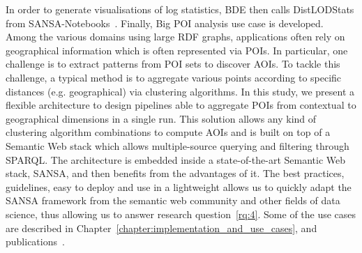 \begin{enumerate}
    In order to generate visualisations of log statistics, BDE then calls DistLODStats from SANSA-Notebooks~\cite{iermilov-2017-sansa-iswc-demo}.
    Finally, Big \gls{POI} analysis use case is developed.
    Among the various domains using large \gls{RDF} graphs, applications often rely on geographical information which is often represented via \gls{POI}s.
    In particular, one challenge is to extract patterns from \gls{POI} sets to discover \gls{AOI}s.
    To tackle this challenge, a typical method is to aggregate various points according to specific distances (e.g. geographical) via clustering algorithms. 
    In this study, we present a flexible architecture to design pipelines able to aggregate \gls{POI}s from contextual to geographical dimensions in a single run. 
    This solution allows any kind of clustering algorithm combinations to compute \gls{AOI}s and is built on top of a Semantic Web stack which allows multiple-source querying and filtering through \gls{SPARQL}.
    The architecture is embedded inside a state-of-the-art Semantic Web stack, SANSA, and then benefits from the advantages of it.
    The best practices, guidelines, easy to deploy and use in a lightweight allows us to quickly adapt the SANSA framework from the semantic web community and other fields of data science, thus allowing us to answer research question~\ref{rq:4}.
    Some of the use cases are described in Chapter~\ref{chapter:implementation_and_use_cases}, and publications~\cite{lehmann-2017-sansa-iswc, iermilov-2017-sansa-iswc-demo, sansa-hubs-and-authorities-transaction-semantics19-poster, piping-clustering-eswc19-poster, graux-2018-sansa-ethereum-semantics-poster, Auer+ICWE-2017}.

\end{enumerate}


